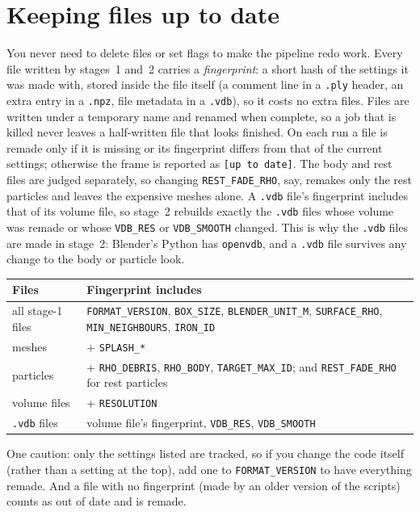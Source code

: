 \documentclass[11pt]{article}
\newcommand{\pc}[1]{\texttt{#1}}
\begin{document}
\section{Keeping files up to date}
\label{sec:stale}
You never need to delete files or set flags to make the pipeline redo work. Every file written by stages~1 and~2 carries a \emph{fingerprint}: a short hash of the settings it was made with, stored inside the file itself (a comment line in a \pc{.ply} header, an extra entry in a \pc{.npz}, file metadata in a \pc{.vdb}), so it costs no extra files. Files are written under a temporary name and renamed when complete, so a job that is killed never leaves a half-written file that looks finished. On each run a file is remade only if it is missing or its fingerprint differs from that of the current settings; otherwise the frame is reported as \pc{[up to date]}. The body and rest files are judged separately, so changing \pc{REST\_FADE\_RHO}, say, remakes only the rest particles and leaves the expensive meshes alone. A \pc{.vdb} file's fingerprint includes that of its volume file, so stage~2 rebuilds exactly the \pc{.vdb} files whose volume was remade or whose \pc{VDB\_RES} or \pc{VDB\_SMOOTH} changed. This is why the \pc{.vdb} files are made in stage~2: Blender's Python has \pc{openvdb}, and a \pc{.vdb} file survives any change to the body or particle look.
 
\begin{center}\small
\begin{tabular}{@{}P{3.4cm} P{9.6cm}@{}}
\hline
\textbf{Files} & \textbf{Fingerprint includes} \\
\hline
all stage-1 files & \pc{FORMAT\_VERSION}, \pc{BOX\_SIZE}, \pc{BLENDER\_UNIT\_M}, \pc{SURFACE\_RHO}, \pc{MIN\_NEIGHBOURS}, \pc{IRON\_ID} \\
meshes & + \pc{SPLASH\_*} \\
particles & + \pc{RHO\_DEBRIS}, \pc{RHO\_BODY}, \pc{TARGET\_MAX\_ID}; and \pc{REST\_FADE\_RHO} for rest particles \\
volume files & + \pc{RESOLUTION} \\
\pc{.vdb} files & volume file's fingerprint, \pc{VDB\_RES}, \pc{VDB\_SMOOTH} \\
\hline
\end{tabular}
\end{center}
 
One caution: only the settings listed are tracked, so if you change the code itself (rather than a setting at the top), add one to \pc{FORMAT\_VERSION} to have everything remade. And a file with no fingerprint (made by an older version of the scripts) counts as out of date and is remade.
 
\end{document}
